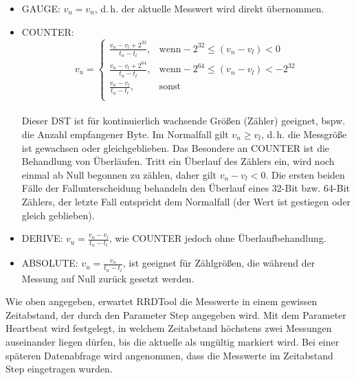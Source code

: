 \documentclass[12pt,ngerman,toc=listofnumbered,toc=bibliographynumbered,toc=index,headsepline=true]{scrbook}
\begin{document}
\begin{itemize}
  \item GAUGE: $v_u = v_n$, d.\,h. der aktuelle Messwert wird direkt
  übernommen.
  \item COUNTER:
\[
v_u = \begin{cases}
 \frac{v_n - v_l + 2^{32}}{t_n - t_l}, & \text{wenn} -2^{32} \leq
(v_n - v_l) < 0\\
 \frac{v_n - v_l + 2^{64}}{t_n - t_l}, & \text{wenn} -2^{64} \leq
(v_n - v_l) < -2^{32}\\
 \frac{v_n - v_l}{t_n - t_l}, & \text{sonst}\\
\end{cases}
\]\\
Dieser DST ist für kontinuierlich wachsende Größen (Zähler) geeignet, bspw. die
Anzahl empfangener Byte. Im Normalfall gilt $v_n \geq v_l$, d.\,h. die Messgröße
ist gewachsen oder gleichgeblieben. Das Besondere an COUNTER ist die Behandlung
von Überläufen. Tritt ein Überlauf des Zählers ein, wird noch einmal ab Null begonnen
zu zählen, daher gilt $v_n - v_l < 0$. Die ersten beiden Fälle der
Fallunterscheidung behandeln den Überlauf eines 32-Bit bzw. 64-Bit Zählers, der
letzte Fall entspricht dem Normalfall (der Wert ist gestiegen oder
gleich geblieben).
  \item DERIVE: $v_u = \frac{v_n - v_l}{t_n - t_l}$, wie COUNTER jedoch
  ohne Überlaufbehandlung.
  \item ABSOLUTE: $v_u = \frac{v_n}{t_n - t_l}$, ist geeignet für Zählgrößen,
  die während der Messung auf Null zurück gesetzt werden.
\end{itemize}

Wie oben angegeben, erwartet RRDTool die Messwerte in einem gewissen
Zeitabstand, der durch den Parameter Step angegeben wird. Mit dem Parameter
Heartbeat wird festgelegt, in welchem Zeitabstand höchstens zwei Messungen
auseinander liegen dürfen, bis die aktuelle als ungültig markiert wird.
Bei einer späteren Datenabfrage wird angenommen, dass die Messwerte
im Zeitabstand Step eingetragen wurden.
\end{document}
